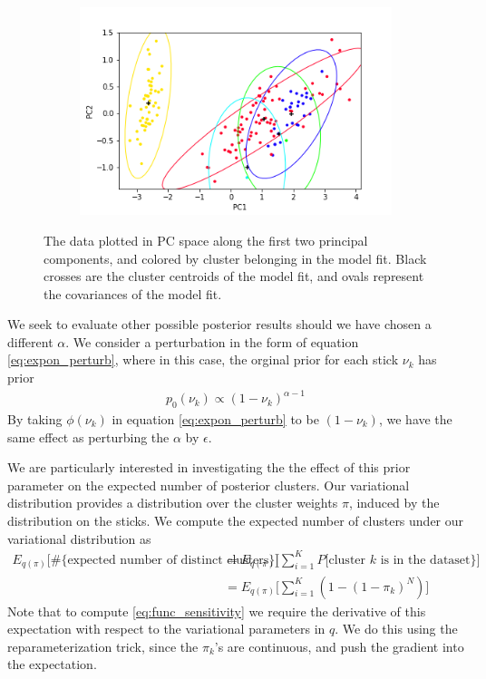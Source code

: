 \documentclass[a4paper]{article}
\begin{document}
\begin{figure}[h!]
	\centering
	\begin{subfigure}[t]{0.4\textwidth}
		\includegraphics[width = \textwidth]{./parametric_sens_results/init_fit_alpha8.png}
	\end{subfigure}
	\caption{The data plotted in PC space along the first two principal components, and colored by
	cluster belonging in the model fit. Black crosses are the cluster centroids of the model fit,
  and ovals represent the
  covariances of the model fit. }
	\label{fig:init_fit}
\end{figure}

We seek to evaluate other possible posterior results should we have chosen a different
$\alpha$. We consider a perturbation in the form of equation \ref{eq:expon_perturb},
where in this case, the orginal prior for each stick $\nu_k$ has prior
\begin{align}
  p_0(\nu_k) \propto (1 - \nu_k)^{\alpha - 1}
\end{align}
By taking $\phi(\nu_k)$ in equation \ref{eq:expon_perturb} to be $(1 - \nu_k)$,
we have the same effect as perturbing the $\alpha$ by $\epsilon$.

We are particularly interested in investigating the the effect of this prior
parameter on the expected number of posterior clusters. Our variational
distribution provides a distribution over the cluster weights $\pi$, induced
by the distribution on the sticks. We compute the expected number of
clusters under our variational distribution as
\begin{align}
  E_{q(\pi)}\Big[\#\{\text{expected number of distinct clusters}\}\Big] &=
  E_{q(\pi)}\Big[\sum_{i=1}^K P[\text{cluster $k$ is in the dataset}\}\Big] \\
    &= E_{q(\pi)} \Big[\sum_{i=1}^K (1 - (1 - \pi_k)^N)\Big]
\end{align}
Note that to compute \ref{eq:func_sensitivity} we require the derivative
of this expectation with respect to the variational parameters in $q$. We do this
using the reparameterization trick, since the $\pi_k$'s are continuous,
and push the gradient into the expectation.
\end{document}
